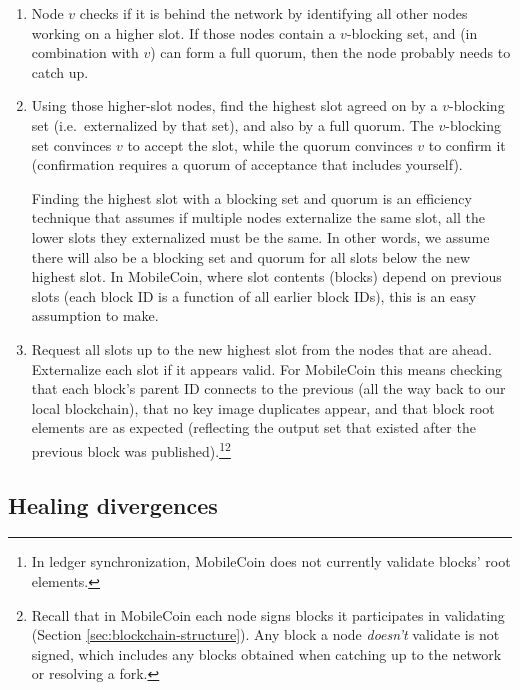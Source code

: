 \begin{enumerate}
    \item Node $v$ checks if it is behind the network by identifying all other nodes working on a higher slot. If those nodes contain a $v$-blocking set, and (in combination with $v$) can form a full quorum, then the node probably needs to catch up.

    \item Using those higher-slot nodes, find the highest slot agreed on by a $v$-blocking set (i.e.\ externalized by that set), and also by a full quorum. The $v$-blocking set convinces $v$ to accept the slot, while the quorum convinces $v$ to confirm it (confirmation requires a quorum of acceptance that includes yourself).

    Finding the highest slot with a blocking set and quorum is an efficiency technique that assumes if multiple nodes externalize the same slot, all the lower slots they externalized must be the same. In other words, we assume there will also be a blocking set and quorum for all slots below the new highest slot. In MobileCoin, where slot contents (blocks) depend on previous slots (each block ID is a function of all earlier block IDs), this is an easy assumption to make.

    \item Request all slots up to the new highest slot from the nodes that are ahead. Externalize each slot if it appears valid. For MobileCoin this means checking that each block's parent ID connects to the previous (all the way back to our local blockchain), that no key image duplicates appear, and that block root elements are as expected (reflecting the output set that existed after the previous block was published).\footnote{In ledger synchronization, MobileCoin does not currently validate blocks' root elements.}\footnote{Recall that in MobileCoin each node signs blocks it participates in validating (Section \ref{sec:blockchain-structure}). Any block a node {\em doesn't} validate is not signed, which includes any blocks obtained when catching up to the network or resolving a fork.}
\end{enumerate}


\subsection{Healing divergences}
\label{subsec:consensus-healing-divergences}

